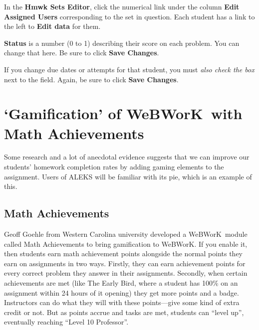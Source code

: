 \documentclass[12pt]{article}
\newcommand{\menu}[1]{\textbf{#1}}
\newcommand{\WW}{WeBWorK}
\newcommand{\HSE}{\menu{Hmwk Sets Editor}}
\begin{document}
In the \HSE, click the numerical link under the column \menu{Edit Assigned Users} corresponding to the set in question.
Each student has a link to the left to \menu{Edit data} for them.

\menu{Status} is a number (0 to 1) describing their score on each problem.
You can change that here.
Be sure to click \menu{Save Changes}.

If you change due dates or attempts for that student, you must \emph{also check the box} next to the field.
Again, be sure to click \menu{Save Changes}.

\section{`Gamification' of \WW\ with Math Achievements}\label{gamification}

Some research and a lot of anecdotal evidence suggests that we can improve our students' homework completion rates by adding gaming elements to the assignment.
Users of ALEKS will be familiar with its pie, which is an example of this.

\subsection{Math Achievements}

Geoff Goehle from Western Carolina university developed a \WW\ module called Math Achievements to bring gamification to \WW.
If you enable it, then students earn math achievement points alongside the normal points they earn on assignments in two ways.
Firstly, they can earn achievement points for every correct problem they answer in their assignments.
Secondly, when certain achievements are met (like The Early Bird, where a student has 100\% on an assignment within 24 hours of it opening) they get more points and a badge.
Instructors can do what they will with these points---give some kind of extra credit or not.
But as points accrue and tasks are met, students can ``level up'', eventually reaching ``Level 10 Professor''.
\end{document}
